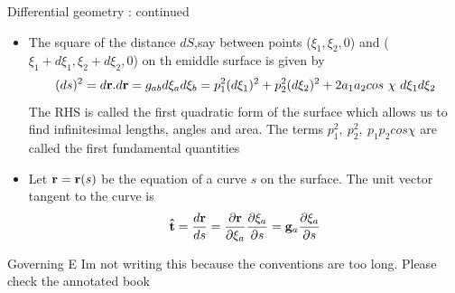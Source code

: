 	\begin{frame}{Differential geometry : continued}
		\begin{itemize}
			\item The square of the distance $dS$,say between points ($\xi_1,\xi_2,0$) and ($\xi_1 + d\xi_1,\xi_2+d\xi_2,0$) on th emiddle surface is given by
			\begin{equation}
			 (ds)^2 = d\mathbf{r}. d\mathbf{r} = g_{ab}d\xi_a d\xi_b = p_1^2(d\xi_1)^2 + p_2^2(d\xi_2)^2 + 2a_1a_2cos~\chi~d\xi_1 d\xi_2
			\end{equation}
			The RHS is called the first quadratic form of the surface which allows us to find infinitesimal lengths, angles and area. The terms $p_1^2,~p_2^2,~p_1p_2cos\chi$ are called the first fundamental quantities
			\item Let $\mathbf{r}= \mathbf{r}(s)$ be the equation of a curve $s$ on the surface. The unit vector tangent to the curve is
			\begin{equation}
				\mathbf{\hat{t}} =  \frac{d \mathbf{r}}{d   s} = \frac{\partial \mathbf{r}}{\partial \xi_a} \frac{\partial \xi_a}{\partial s} = \mathbf{g}_a \frac{\partial \xi_a}{\partial s}
			\end{equation}			
		\end{itemize}
	\end{frame}


	\begin{frame}{Governing E}
		Im not writing this because the conventions are too long. Please check the annotated book
	\end{frame}